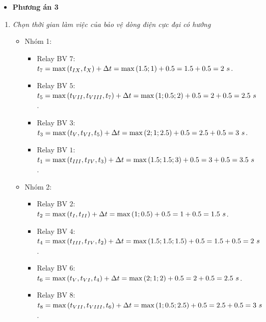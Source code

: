 \documentclass[12pt,a4paper]{article}
\begin{document}
\begin{enumerate}
			\begin{itemize}
				\item \textbf{Phương án 3}				
			\end{itemize}

			\begin{enumerate}[\it a.]
			\item \emph{Chọn thời gian làm việc của bảo vệ dòng điện cực đại có hướng}
					\begin{itemize}					
						\item Nhóm 1:
							\begin{itemize}
								\item Relay BV $7$: $t_7 = \max\left({t_{IX}, t_{X}}\right) + \Delta t = \max\left({1.5; 1}\right) + 0.5 = 1.5 + 0.5 = 2 ~s$.
								
								\item Relay BV $5$: $t_5 = \max\left({t_{VII}, t_{VIII}, t_7}\right) + \Delta t = \max\left({1; 0.5; 2}\right) + 0.5 = 2 + 0.5 = 2.5 ~s$.
								
								\item Relay BV $3$: $t_3 = \max\left({t_{V}, t_{VI}, t_5}\right) + \Delta t = \max\left({2; 1; 2.5}\right) + 0.5 = 2.5 + 0.5 = 3 ~s$.
								
								\item Relay BV $1$: $t_1 = \max\left({t_{III}, t_{IV}, t_3}\right) + \Delta t = \max\left({1.5; 1.5; 3}\right) + 0.5 = 3 + 0.5 = 3.5 ~s$.			
							\end{itemize}
						
						\item Nhóm 2:
							\begin{itemize}
								\item Relay BV $2$: $t_2 = \max\left({t_{I}, t_{II}}\right) + \Delta t = \max\left({1; 0.5}\right) + 0.5 = 1 + 0.5 = 1.5 ~s$.
								
								\item Relay BV $4$: $t_4 = \max\left({t_{III}, t_{IV}, t_2}\right) + \Delta t = \max\left({1.5; 1.5; 1.5}\right) + 0.5 = 1.5 + 0.5 = 2 ~s$.
								
								\item Relay BV $6$: $t_6 = \max\left({t_{V}, t_{VI}, t_4}\right) + \Delta t = \max\left({2; 1; 2}\right) + 0.5 = 2 + 0.5 = 2.5 ~s$.
								
								\item Relay BV $8$: $t_8 = \max\left({t_{VII}, t_{VIII}, t_6}\right) + \Delta t = \max\left({1; 0.5; 2.5}\right) + 0.5 = 2.5 + 0.5 = 3 ~s$.
							\end{itemize}
					\end{itemize}
					

\end{enumerate}
\end{enumerate}
\end{document}

